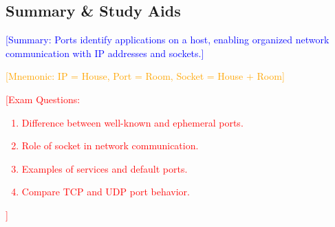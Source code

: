 \documentclass[12pt]{article}
\begin{document}
\subsection{Summary \& Study Aids}
\textcolor{blue}{[Summary: Ports identify applications on a host, enabling organized network communication with IP addresses and sockets.]}

\textcolor{orange}{[Mnemonic: IP = House, Port = Room, Socket = House + Room]}

\textcolor{red}{[Exam Questions:
            \begin{enumerate}
                \item Difference between well-known and ephemeral ports.
                \item Role of socket in network communication.
                \item Examples of services and default ports.
                \item Compare TCP and UDP port behavior.
            \end{enumerate}
        ]}
\end{document}

